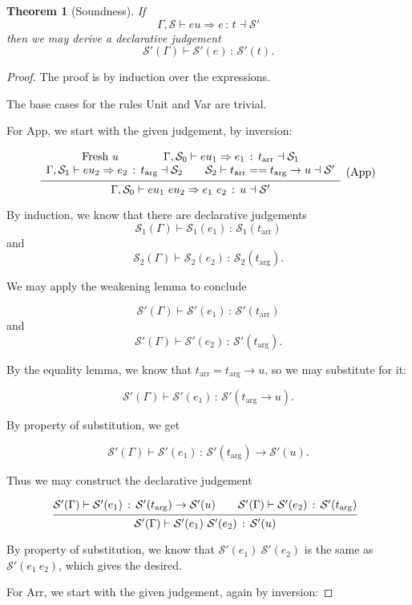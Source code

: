 \documentclass{article}
\newtheorem{theorem}{Theorem}
\newcommand{\G}{\Gamma}
\newcommand{\St}{\mathcal{S}}
\newcommand{\tp}{t}
\newcommand{\tarr}{t_{\text{arr}}}
\newcommand{\targ}{t_{\text{arg}}}
\newcommand{\uv}{u}
\newcommand{\eu}{eu}
\newcommand{\e}{e}
\newcommand{\spc}{\qquad}
\newcommand{\eq}{==}
\renewcommand{\implies}{\Rightarrow}
\newcommand{\fresh}{\text{Fresh}\ }
\newcommand{\withtp}[2]{{#1} \,:\, {#2}}
\newcommand{\app}[2]{{#1}\ {#2}}
\newcommand{\arr}[2]{{#1} \to {#2}}
\newcommand{\hastp}[3]{#1 \vdash {\withtp {#2} {#3}}}
\newcommand{\algtp}[6]{#1, #2 \vdash #3 \implies {\withtp {#4} {#5}} \dashv #6}
\newcommand{\equals}[4]{{#1} \vdash {#2} \eq {#3} \dashv {#4}}
\newcommand{\deduct}[3][]
{
  \begin{prooftree}
    \hypo{#2}
    \infer1[\text{#1}]{#3}
  \end{prooftree}
}
\begin{document}
\begin{theorem}[Soundness]
  If
\[ \algtp \G \St \eu \e \tp \St' \]
  then we may derive a declarative judgement
\[ \hastp {\St'(\G)} {\St'(\e)} {\St'(t)}.\]
\end{theorem}

\begin{proof}
  The proof is by induction over the expressions.

  The base cases for the rules Unit and Var are trivial.

  For App, we start with the given judgement, by inversion:

\[
  \deduct
  {\begin{array}{c}
    \fresh \uv \spc \spc
   \algtp \G {\St_0} {\eu_1} {\e_1} \tarr {\St_1} \\
   \algtp \G {\St_1} {\eu_2} {\e_2} \targ {\St_2} \spc
   \equals {\St_2} {\tarr} {\arr {\targ} \uv} {\St'}
   \end{array}
  }
  {\algtp \G {\St_0} {\app {\eu_1} {\eu_2}} {\app {\e_1} {\e_2}} {\uv} {\St'}}
  {\text{(App)}}
\]

  By induction, we know that there are declarative judgements
  \[ \hastp {\St_1(\G)} {\St_1(\e_1)} {\St_1(\tarr)} \]
  and
  \[ \hastp {\St_2(\G)} {\St_2(\e_2)} {\St_2(\targ)}.\]

  We may apply the weakening lemma to conclude 

  \[ \hastp {\St'(\G)} {\St'(\e_1)} {\St'(\tarr)} \]
  and
  \[ \hastp {\St'(\G)} {\St'(\e_2)} {\St'(\targ)}.\]

  By the equality lemma, we know that \(\tarr = \arr \targ \uv\), so we may
  substitute for it:

  \[ \hastp {\St'(\G)} {\St'(\e_1)} {\St'(\arr \targ \uv)}.\]

  By property of substitution, we get

  \[ \hastp {\St'(\G)} {\St'(\e_1)} {\arr {\St'(\targ)} {\St'(\uv)}}.\]

  Thus we may construct the declarative judgement
  
  \[
    \deduct
    {\hastp {\St'(\G)} {\St'(\e_1)} {\arr {\St'(\targ)} {\St'(\uv)}} \spc
     \hastp {\St'(\G)} {\St'(\e_2)} {\St'(\targ)}
    }
    {\hastp {\St'(\G)} {\app {\St'(\e_1)} {\St'(\e_2)}} {\St'(\uv)}}
    {}
  \]

  By property of substitution, we know that \(\app {\St'(\e_1)} {\St'(\e_2)}\) is
  the same as \(\St'(\app {\e_1} {\e_2})\), which gives the desired.

  For Arr, we start with the given judgement, again by inversion:


\end{proof}
\end{document}
